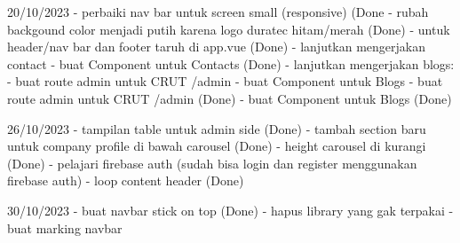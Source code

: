 20/10/2023
    - perbaiki nav bar untuk screen small (responsive) (Done
    - rubah backgound color menjadi putih karena logo duratec hitam/merah (Done)
    - untuk header/nav bar dan footer taruh di app.vue (Done)
    - lanjutkan mengerjakan contact
         - buat Component untuk Contacts (Done)
    - lanjutkan mengerjakan blogs:
        - buat route admin untuk CRUT   /admin
        - buat Component untuk Blogs
        - buat route admin untuk CRUT   /admin (Done)
        - buat Component untuk Blogs (Done)
    
26/10/2023
   - tampilan table untuk admin side (Done)
   - tambah section baru untuk company profile di bawah carousel (Done)
   - height carousel di kurangi (Done)
   - pelajari firebase auth (sudah bisa login dan register menggunakan firebase auth)
   - loop content header (Done)

30/10/2023
   - buat navbar stick on top (Done)
   - hapus library yang gak terpakai 
   - buat marking navbar
